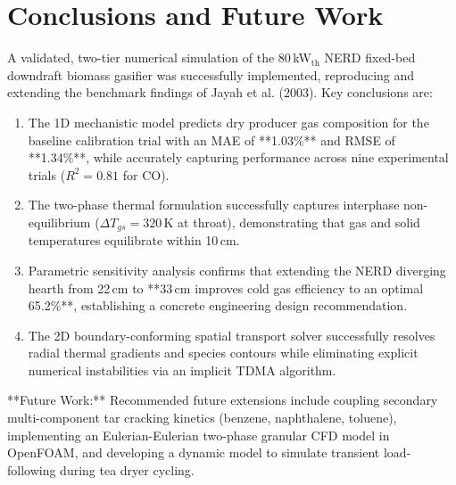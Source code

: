 \documentclass[11pt,a4paper]{article}
\begin{document}
\section{Conclusions and Future Work}
A validated, two-tier numerical simulation of the 80\,kW$_{\text{th}}$ NERD fixed-bed downdraft biomass gasifier was successfully implemented, reproducing and extending the benchmark findings of Jayah et al. (2003). Key conclusions are:
\begin{enumerate}[leftmargin=1.5em]
    \item The 1D mechanistic model predicts dry producer gas composition for the baseline calibration trial with an MAE of **1.03\%** and RMSE of **1.34\%**, while accurately capturing performance across nine experimental trials ($R^2 = 0.81$ for CO).
    \item The two-phase thermal formulation successfully captures interphase non-equilibrium ($\Delta T_{gs} = 320$\,K at throat), demonstrating that gas and solid temperatures equilibrate within 10\,cm.
    \item Parametric sensitivity analysis confirms that extending the NERD diverging hearth from 22\,cm to **33\,cm improves cold gas efficiency to an optimal 65.2\%**, establishing a concrete engineering design recommendation.
    \item The 2D boundary-conforming spatial transport solver successfully resolves radial thermal gradients and species contours while eliminating explicit numerical instabilities via an implicit TDMA algorithm.
\end{enumerate}

**Future Work:** Recommended future extensions include coupling secondary multi-component tar cracking kinetics (benzene, naphthalene, toluene), implementing an Eulerian-Eulerian two-phase granular CFD model in OpenFOAM, and developing a dynamic model to simulate transient load-following during tea dryer cycling.
\end{document}
